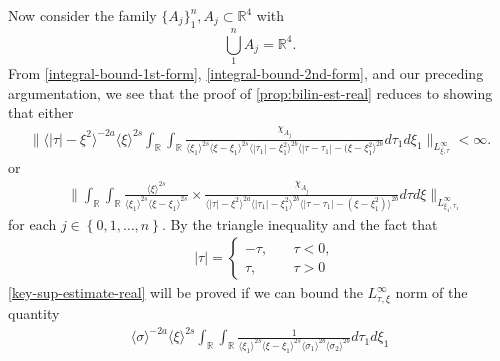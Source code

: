 \documentclass[12pt,reqno]{amsart}
\numberwithin{equation}{section}  %
\numberwithin{figure}{section}
\newcommand{\rr}{\mathbb{R}}
\theoremstyle{plain}
\theoremstyle{definition}
\theoremstyle{remark}
\begin{document}
%
%
Now consider the family $\{A_{j}\}_{1}^{n}, A_{j} \subset \rr^{4}$ with
$$\bigcup_{1}^{n} A_{j}= \rr^{4}.$$ From \eqref{integral-bound-1st-form},
\eqref{integral-bound-2nd-form}, and our preceding argumentation,
we see that the proof of \autoref{prop:bilin-est-real} reduces to showing that
either 
%
%
%
%
\begin{equation}
  \label{key-sup-estimate-real}
  \begin{split}
     \| \langle | \tau | - \xi^{2} \rangle ^{-2a} \langle \xi
    \rangle ^{2s}
    \int_{\rr} \int_{\rr} \frac{\chi_{A_{j}}}{ \langle \xi_{1} \rangle ^{2s} \langle
\xi-\xi_{1} \rangle ^{2s} \langle | \tau_{1}|-\xi_{1}^{2} \rangle^{2b}  \langle  |\tau -
    \tau_{1} | -(\xi - \xi_{1}^{2}
    \rangle ^{2b} } d \tau_1 d \xi_{1} \|_{L^\infty_{\xi, \tau}} < \infty.
  \end{split}
\end{equation}
%
or
\begin{equation}
\begin{split}
  & \| \int_{\rr} \int_{\rr} \frac{\langle \xi \rangle ^{2s}}{\langle \xi_{1} \rangle ^{2s} \langle
  \xi - \xi_{1}\rangle ^{2s}}  \times \frac{\chi_{A_{j}}}{\langle | \tau | - \xi^{2} \rangle
  ^{2a} \langle | \tau_{1} | - \xi_{1}^{2} \rangle ^{2b} \langle | \tau -
  \tau_{1} | - (\xi - \xi_{1}^{2}) \rangle ^{2b}} d \tau d \xi
  \|_{L^{\infty}_{\xi_{1}, \tau_{1}}}
\end{split}
\end{equation}
for each $j \in \left\{ 0,1,\dots,n \right\}$. 
By the triangle inequality and the fact that 
%
%
\begin{equation*}
\begin{split}
& | \tau | =
\begin{cases}
  - \tau, \quad & \tau < 0, 
\\
\tau, \quad & \tau > 0
\end{cases}
\end{split}
\end{equation*}
%
%
\eqref{key-sup-estimate-real} will be proved if we can bound the
$L^{\infty}_{\tau, \xi}$ norm of the quantity
%
%
\begin{equation}
  \label{sup-est-gen-real-1}
\begin{split}
      \langle \sigma \rangle ^{-2a} \langle \xi
    \rangle ^{2s}
    \int_{\rr} \int_{\rr} \frac{1}{ \langle \xi_{1} \rangle ^{2s} \langle \xi-\xi_{1} \rangle ^{2s} 
\langle \sigma_{1} \rangle^{2b} \langle  \sigma_{2} \rangle^{2b} }
d \tau_1 d \xi_{1} 
  \end{split}
\end{equation}
\end{document}
